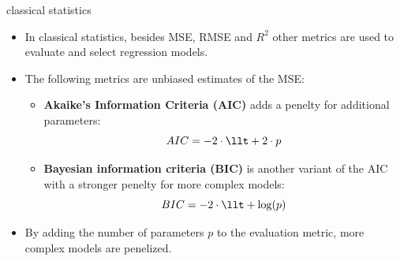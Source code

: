 \documentclass[11pt,compress,t,notes=noshow, xcolor=table]{beamer}
\begin{document}

\begin{vbframe}{classical statistics}
  \begin{itemize}
    \item In classical statistics, besides MSE, RMSE and $R^2$ other metrics are used to evaluate and select regression models. 
    \item The following metrics are unbiased estimates of the MSE: 
    \begin{itemize}
      \item \textbf{Akaike’s Information Criteria (AIC)} adds a penelty for additional parameters: 
      $$ AIC = -2 \cdot \llt + 2 \cdot p$$
      
      
      \item \textbf{Bayesian information criteria (BIC)} is another variant of the AIC with a stronger penelty for more complex models: 
      $$ BIC = -2 \cdot \llt + \log(p)$$
    \end{itemize}
    
    \item By adding the number of parameters $p$ to the evaluation metric, more complex models are penelized. 
    
 \end{itemize}

\end{vbframe}


\endlecture
\end{document}
